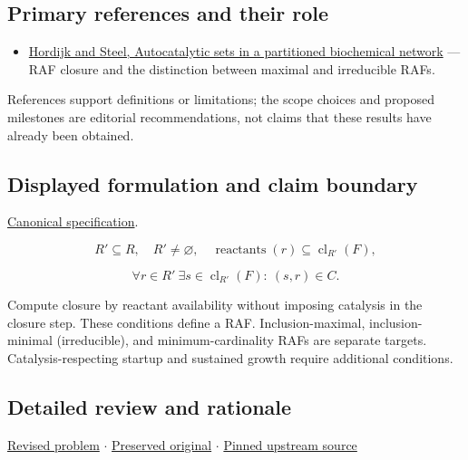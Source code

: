\documentclass[
  11pt,
]{article}
\providecommand{\tightlist}{%
  \setlength{\itemsep}{0pt}\setlength{\parskip}{0pt}}
\begin{document}
\subsection{Primary references and their role}

\begin{itemize}
\tightlist
\item
  \href{https://pmc.ncbi.nlm.nih.gov/articles/PMC4034171/}{Hordijk and
  Steel, Autocatalytic sets in a partitioned biochemical network} ---
  RAF closure and the distinction between maximal and irreducible RAFs.
\end{itemize}

References support definitions or limitations; the scope choices and
proposed milestones are editorial recommendations, not claims that these
results have already been obtained.

\subsection{Displayed formulation and claim boundary}

\href{https://github.com/rick-stevens-ai/Pure-Thought/blob/main/PRDs/29-Chemical-Reaction-Networks-Origins.md}{Canonical
specification}.

\[R'\subseteq R,\quad R'\ne\varnothing,\quad
\operatorname{reactants}(r)\subseteq\operatorname{cl}_{R'}(F),\]

\[\forall r\in R'\ \exists s\in\operatorname{cl}_{R'}(F):\ (s,r)\in C.\]

Compute closure by reactant availability without imposing catalysis in
the closure step. These conditions define a RAF. Inclusion-maximal,
inclusion-minimal (irreducible), and minimum-cardinality RAFs are
separate targets. Catalysis-respecting startup and sustained growth
require additional conditions.

\subsection{Detailed review and rationale}

\href{https://github.com/rick-stevens-ai/Pure-Thought/blob/main/PRDs/29-Chemical-Reaction-Networks-Origins.md}{Revised
problem} \ensuremath{\cdot}
\href{https://github.com/rick-stevens-ai/Pure-Thought/blob/main/archive/original-PRDs/29-Chemical-Reaction-Networks-Origins.md}{Preserved
original} \ensuremath{\cdot}
\href{https://github.com/rick-stevens-ai/Pure-Thought/blob/f854d4e12b55c1f5b5c2a964b75f2d23496d981e/PRDs/29-Chemical-Reaction-Networks-Origins.md}{Pinned
upstream source}
\end{document}
